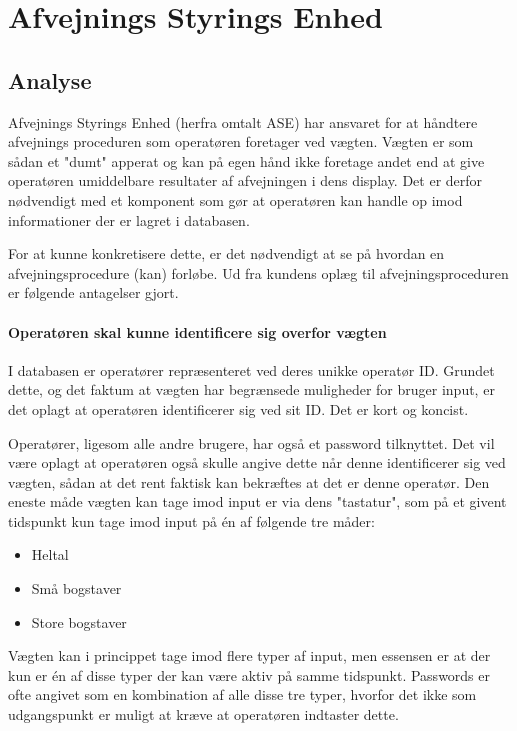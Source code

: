 \documentclass[a4paper]{article}
\begin{document}

\clearpage



\section{Afvejnings Styrings Enhed} %

\subsection{Analyse} %

Afvejnings Styrings Enhed (herfra omtalt ASE) har ansvaret for at håndtere afvejnings proceduren som operatøren foretager ved vægten. Vægten er som sådan et "dumt" apperat og kan på egen hånd ikke foretage andet end at give operatøren umiddelbare resultater af afvejningen i dens display. Det er derfor nødvendigt med et komponent som gør at operatøren kan handle op imod informationer der er lagret i databasen.

For at kunne konkretisere dette, er det nødvendigt at se på hvordan en afvejningsprocedure (kan) forløbe. Ud fra kundens oplæg til afvejningsproceduren er følgende antagelser gjort.

\paragraph{Operatøren skal kunne identificere sig overfor vægten} %

I databasen er operatører repræsenteret ved deres unikke operatør ID. Grundet dette, og det faktum at vægten har begrænsede muligheder for bruger input, er det oplagt at operatøren identificerer sig ved sit ID. Det er kort og koncist.

Operatører, ligesom alle andre brugere, har også et password tilknyttet. Det vil være oplagt at operatøren også skulle angive dette når denne identificerer sig ved vægten, sådan at det rent faktisk kan bekræftes at det er denne operatør. Den eneste måde vægten kan tage imod input er via dens "tastatur", som på et givent tidspunkt kun tage imod input på én af følgende tre måder:
\begin{itemize}
  \item Heltal
  \item Små bogstaver
  \item Store bogstaver
\end{itemize}
Vægten kan i princippet tage imod flere typer af input, men essensen er at der kun er én af disse typer der kan være aktiv på samme tidspunkt. Passwords er ofte angivet som en kombination af alle disse tre typer, hvorfor det ikke som udgangspunkt er muligt at kræve at operatøren indtaster dette.
\end{document}
